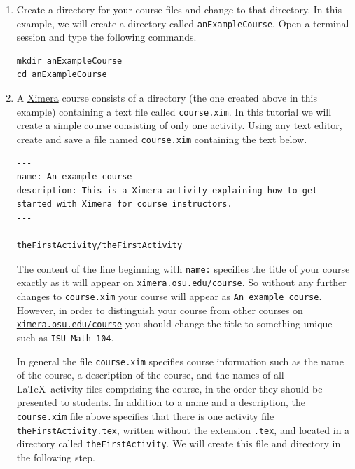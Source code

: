 \documentclass{ximera}
\begin{document}
\begin{enumerate}
\item Create a directory for your course files
and change to that directory.
In this example, we will create a directory called
\verb!anExampleCourse!.
Open a terminal session and type the following commands.
\begin{center}
\begin{verbatim}
mkdir anExampleCourse
cd anExampleCourse 
\end{verbatim}
\end{center}

\item A \href{http://ximera.osu.edu}{\sf Ximera} 
course consists of a directory (the one
created above in this example)
containing a text file called \verb!course.xim!. 
In this tutorial we will create a simple
course consisting of only one activity.
Using any text editor, create and save a file named
\verb!course.xim! containing the text below.

\begin{verbatim}
---
name: An example course
description: This is a Ximera activity explaining how to get started with Ximera for course instructors.
---

theFirstActivity/theFirstActivity
\end{verbatim}
\begin{warning}
The content of the line beginning with \verb!name:!
specifies the title of your course exactly as it will appear on
\href{http://ximera.osu.edu/course}{\tt ximera.osu.edu/course}.
So without any further changes to \verb!course.xim!
your course will appear as \verb!An example course!.
However, in order to distinguish your course from
other courses on
\href{http://ximera.osu.edu/course}{\tt ximera.osu.edu/course}
you should change the title to something unique
such as \verb!ISU Math 104!.
\end{warning}

\begin{remark}
In general the file \verb!course.xim! specifies course information
such as the name of the course, a description of the course,
and the names of all \LaTeX\ activity files 
comprising the course, in the order
they should be presented to students.
In addition to a name and a description,
the \verb!course.xim! file above specifies that 
there is one activity file \verb!theFirstActivity.tex!,
written without the extension \verb!.tex!,  
and located in a directory called \verb!theFirstActivity!.
We will create this file and directory in the following step.


\end{remark}
\end{enumerate}
\end{document}

